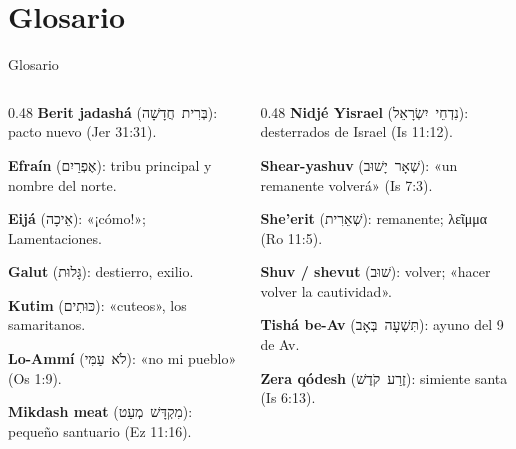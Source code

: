 \documentclass[hyperref={bookmarks=false},aspectratio=169]{beamer}
\newcommand{\heb}[1]{\mbox{\foreignlanguage{hebrew}{#1}}}
\newcommand{\grc}[1]{\foreignlanguage{ancientgreek}{#1}}
\begin{document}
\section{Glosario}
\begin{frame}{Glosario}
\begin{columns}[T,onlytextwidth]
\begin{column}{0.48\textwidth}\footnotesize
\textbf{Berit jadashá} (\heb{בְּרִית חֲדָשָׁה}): pacto nuevo (Jer 31:31).\par\smallskip
\textbf{Efraín} (\heb{אֶפְרַיִם}): tribu principal y nombre del norte.\par\smallskip
\textbf{Eijá} (\heb{אֵיכָה}): «¡cómo!»; Lamentaciones.\par\smallskip
\textbf{Galut} (\heb{גָּלוּת}): destierro, exilio.\par\smallskip
\textbf{Kutim} (\heb{כּוּתִים}): «cuteos», los samaritanos.\par\smallskip
\textbf{Lo-Ammí} (\heb{לֹא עַמִּי}): «no mi pueblo» (Os 1:9).\par\smallskip
\textbf{Mikdash meat} (\heb{מִקְדָּשׁ מְעַט}): pequeño santuario (Ez 11:16).
\end{column}
\begin{column}{0.48\textwidth}\footnotesize
\textbf{Nidjé Yisrael} (\heb{נִדְחֵי יִשְׂרָאֵל}): desterrados de Israel (Is 11:12).\par\smallskip
\textbf{Shear-yashuv} (\heb{שְׁאָר יָשׁוּב}): «un remanente volverá» (Is 7:3).\par\smallskip
\textbf{She'erit} (\heb{שְׁאֵרִית}): remanente; \grc{λεῖμμα} (Ro 11:5).\par\smallskip
\textbf{Shuv / shevut} (\heb{שׁוּב}): volver; «hacer volver la cautividad».\par\smallskip
\textbf{Tishá be-Av} (\heb{תִּשְׁעָה בְּאָב}): ayuno del 9 de Av.\par\smallskip
\textbf{Zera qódesh} (\heb{זֶרַע קֹדֶשׁ}): simiente santa (Is 6:13).
\end{column}
\end{columns}
\end{frame}

\end{document}
